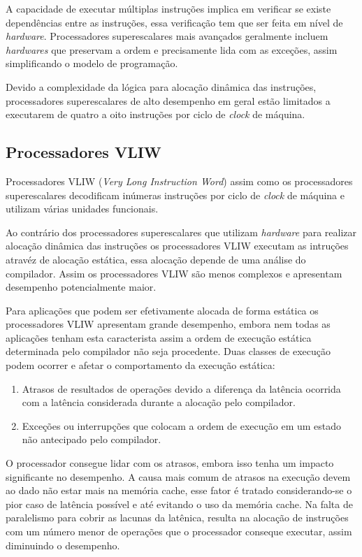 A capacidade de executar múltiplas instruções implica em verificar se existe
dependências entre as instruções, essa verificação tem que ser feita em nível de
\textit{hardware}. 
Processadores superescalares mais avançados geralmente incluem 
\textit{hardwares} que preservam a ordem e precisamente lida com as exceções, 
assim simplificando o modelo de programação.

Devido a complexidade da lógica para alocação dinâmica das instruções,
processadores superescalares de alto desempenho em geral estão limitados a
executarem de quatro a oito instruções por ciclo de \textit{clock} de máquina.


\subsection{Processadores VLIW}

Processadores VLIW (\textit{Very Long Instruction Word}) assim como os
processadores superescalares decodificam inúmeras instruções por ciclo de
\textit{clock} de máquina e utilizam várias unidades funcionais.

Ao contrário dos processadores superescalares que utilizam \textit{hardware}
para realizar alocação dinâmica das instruções os processadores VLIW executam as 
intruções atravéz de alocação estática, essa alocação depende de uma análise do
compilador.
Assim os processadores VLIW são menos complexos e apresentam desempenho 
potencialmente maior.

Para aplicações que podem ser efetivamente alocada de forma estática os
processadores VLIW apresentam grande desempenho, embora nem todas as aplicações
tenham esta caracterista assim a ordem de execução estática determinada pelo
compilador não seja procedente. 
Duas classes de execução podem ocorrer e afetar o comportamento da execução 
estática:

\begin{enumerate}
        \item Atrasos de resultados de operações devido a diferença da latência
                ocorrida com a latência considerada durante a alocação pelo
                compilador.
        \item Exceções ou interrupções que colocam a ordem de execução em um
                estado não antecipado pelo compilador.
\end{enumerate}

O processador consegue lidar com os atrasos, embora isso tenha um impacto 
significante no desempenho. 
A causa mais comum de atrasos na execução devem ao dado não estar mais na 
memória cache, esse fator é tratado considerando-se o pior caso de latência 
possível e até evitando o uso da memória cache. 
Na falta de paralelismo para cobrir as lacunas da latênica, resulta na 
alocação de instruções com um número menor de operações que o processador 
conseque executar, assim diminuindo o desempenho.


